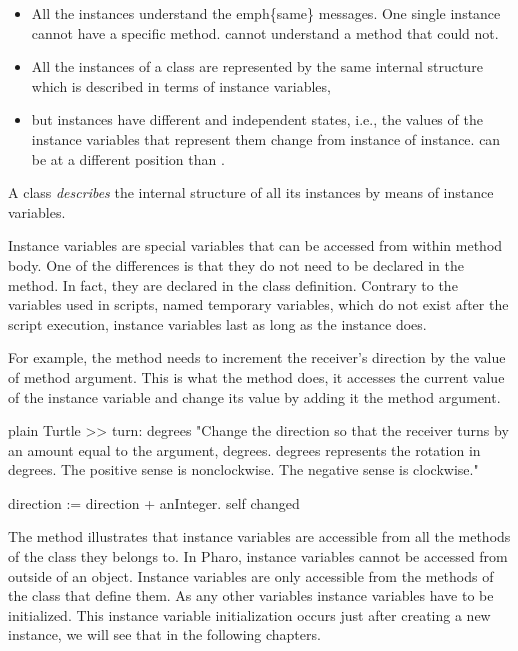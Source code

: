 \documentclass[10pt,twoside,english]{_support/latex/sbabook/sbabook}
\begin{document}
\begin{itemize}
\item All the instances understand the emph\{same\} messages.  One single instance cannot have a specific method.   cannot understand a method that  could not. 
\item All the instances of a class  are represented by the same internal structure which is described in terms of  instance variables, 
\item but instances have different and independent states, i.e., the  values of the instance variables that represent them change from instance of instance.  can be at a different position than .
\end{itemize}

\begin{important}
A class \textit{describes} the internal structure of all its instances by means of instance variables.
\end{important}

Instance variables are special variables that can be accessed from within method body. One of the differences is that they do not need to be declared in the method.  In fact, they are declared in the class definition.  Contrary to  the variables used in scripts, named temporary variables, which do not exist after the script execution, instance variables last as long as the instance does.  

For example, the method  needs to increment the receiver's direction by the value of method argument. This is what the method  does, it accesses the current value of the instance variable  and change its value by adding it the method argument.

\begin{displaycode}{plain}
Turtle >> turn: degrees 
   "Change the direction so that the receiver turns by an amount 
   equal to the argument, degrees. degrees represents the rotation in 
   degrees. The positive sense is nonclockwise. The negative sense is 
   clockwise."

   direction := direction + anInteger.
   self changed
\end{displaycode}

The method  illustrates that instance variables are accessible from all the methods of the class they belongs to. 
In Pharo, instance variables cannot be accessed from outside of an object. Instance variables are only accessible from the methods of the class that define them. As any other variables instance variables have to be initialized.  This instance variable initialization occurs just after creating a new instance, we will see that in the following chapters.  
\end{document}
